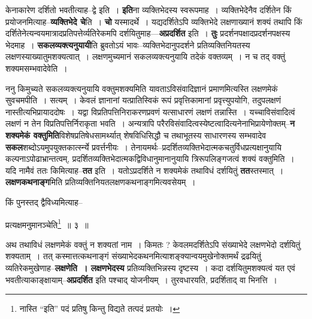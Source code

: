 \documentclass[article,12pt,a4paper]{memoir}
\begin{document}
	  \pstart केनाकारेण दर्शितो भवतीत्याह--द्वे इति । \textbf{इति}ना व्यक्तिभेदस्य स्वरूपमाह । व्यक्तिभेदेनैव दर्शितेन किं प्रयोजनमित्याह--\textbf{व्यक्तिभेदे चे}ति । \textbf{चो} यस्मादर्थे । यद्यदर्शितेऽपि व्यक्तिभेदे लक्षणाख्यानं शक्यं तथापि किं दर्शितेनेत्यन्वयमात्रादप्रतिपत्तेर्व्यतिरेकमपि दर्शयितुमाह—\textbf{अप्रदर्शित} इति । \textbf{तुः} प्रदर्शनपक्षादप्रदर्शनपक्षस्य भेदमाह । \textbf{सकलव्यक्त्यनुयायी}ति ब्रुवतोऽयं भावः--व्यक्तिभेदानुपदर्शने प्रतिव्यक्तिनियतस्य लक्षणस्याख्यातुमशक्यत्वात् । लक्षणमुच्यमानं सकलव्यक्त्यनुयायि तदेकं वक्तव्यम् । न च तद् वक्तुं शक्यमसम्भवादेवेति ।
	\pend
      

	  \pstart ननु किमुच्यते सकलव्यक्त्यनुयायि वक्तुमशक्यमिति यावताऽविसंवादिज्ञानं प्रमाणमित्यस्ति लक्षणमेकं सुवचमपीति । सत्यम् । केवलं ज्ञानानां यत्प्रातिस्विकं रूपं प्रवृत्तिकामानां प्रवृत्त्युपयोगि, तदुपलक्षणं नास्तीत्यभिप्रायाददोषः । यद्वा विप्रतिपत्तिनिराकरणप्रवणं यत्साधारणं लक्षणं तन्नास्ति । यच्चाविसंवादित्वं लक्षणं न तेन विप्रतिपत्तिर्निराकृता भवति । अन्यत्रापि परैरविसंवादित्वस्येष्टत्वादित्यनेनाभिप्रायेणोक्तम्--\textbf{न शक्यमेकं वक्तुमिति}विशेषप्रतिषेधसामर्थ्यात् शेषविधिसिद्धौ च तथाभूतस्य साधारणस्य सम्भवादेव \textbf{सकल}शब्दोऽयमुपयुक्तकार्त्स्न्ये प्रवर्त्त\leavevmode{}नीयः । तेनायमर्थः--प्रदर्शितव्यक्तिभेदात्मकचतुर्विधप्रत्यक्षानुयायि कल्पनाऽपोढाभ्रान्तत्वम्, प्रदर्शितव्यक्तिभेदात्मकद्विविधानुमानानुयायि त्रिरूपलिङ्गजत्वं शक्यं वक्तुमिति । यदि नामैवं ततः किमित्याह--\textbf{तत} इति । यतोऽप्रदर्शिते न शक्यमेकं तथाविधं दर्शयितुं \textbf{तत}स्तस्मात् । \textbf{लक्षणकथनाङ्ग}मिति प्रतिव्यक्तिनियतलक्षणकथनाङ्गमित्यवसेयम् ।
	\pend
	  \bigskip
	  \begingroup
	

	  \pstart किं पुनस्तद् द्वैविध्यमित्याह--
	\pend
       
	  \bigskip
	  \begingroup
	

	  \pstart प्रत्यक्षमनुमानञ्चेति\footnote{नास्ति “इति” पदं \cite{dp-msB} \cite{dp-edP} \cite{dp-edH} \cite{dp-edE} \cite{dp-edN} प्रतिषु किन्तु विद्यते तत्पदं \cite{dp-msC} \cite{dp-msD} प्रतयोः ।} ॥ ३ ॥
	\pend
      
	  \endgroup
	
	  \endgroup
	

	  \pstart अथ तथाविधं लक्षणमेकं वक्तुं न शक्यतां नाम । किमतः ? केवलमदर्शितेऽपि संख्याभेदे लक्षणभेदो दर्शयितुं शक्यताम् । तत् कस्मात्तत्कथनाङ्गं संख्याभेदकथनमित्याशङ्क्यान्वयमुखेनोक्तमर्थं द्रढयितुं व्यतिरेकमुखेणाह--\textbf{लक्षणेति । लक्षणभेदस्य} प्रतिव्यक्तिभिन्नस्य दृष्टस्य । कदा दर्शयितुमशक्यत्वं यत एवं भवतीत्याकाङ्क्षायाम्--\textbf{अप्रदर्शित} इति पश्चाद् योजनीयम् । तुरवधारयति, प्रदर्शिताद् वा भिनत्ति ।
	\pend
      
\end{document}
